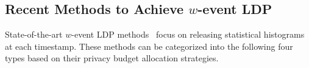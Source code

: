 \documentclass[acmsmall]{acmart}
\begin{document}



\subsection{\texorpdfstring{Recent Methods to Achieve $w$-event LDP}{Recent Methods to Achieve w-event LDP}}
\label{ss:competitors}

State-of-the-art $w$-event LDP methods~\cite{Ren2022} focus on releasing
statistical histograms at each timestamp.
These methods can be categorized into the following four types based on their
privacy budget allocation strategies.
\end{document}
